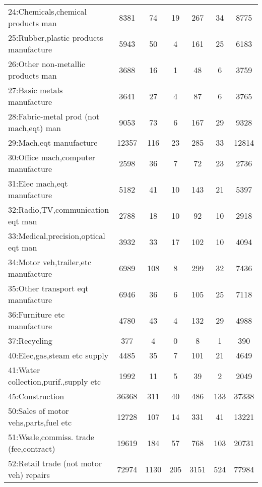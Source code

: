 {\begin{longtable}{l*{6}{c}}
24:Chemicals,chemical products man&     8381&       74&       19&      267&       34&     8775\\
25:Rubber,plastic products manufacture&     5943&       50&        4&      161&       25&     6183\\
26:Other non-metallic products man&     3688&       16&        1&       48&        6&     3759\\
27:Basic metals manufacture&     3641&       27&        4&       87&        6&     3765\\
28:Fabric-metal prod (not mach,eqt) man&     9053&       73&        6&      167&       29&     9328\\
29:Mach,eqt manufacture&    12357&      116&       23&      285&       33&    12814\\
30:Office mach,computer manufacture&     2598&       36&        7&       72&       23&     2736\\
31:Elec mach,eqt manufacture&     5182&       41&       10&      143&       21&     5397\\
32:Radio,TV,communication eqt man&     2788&       18&       10&       92&       10&     2918\\
33:Medical,precision,optical eqt man&     3932&       33&       17&      102&       10&     4094\\
34:Motor veh,trailer,etc manufacture&     6989&      108&        8&      299&       32&     7436\\
35:Other transport eqt manufacture&     6946&       36&        6&      105&       25&     7118\\
36:Furniture etc manufacture&     4780&       43&        4&      132&       29&     4988\\
37:Recycling&      377&        4&        0&        8&        1&      390\\
40:Elec,gas,steam etc supply&     4485&       35&        7&      101&       21&     4649\\
41:Water collection,purif.,supply etc&     1992&       11&        5&       39&        2&     2049\\
45:Construction&    36368&      311&       40&      486&      133&    37338\\
50:Sales of motor vehs,parts,fuel etc&    12728&      107&       14&      331&       41&    13221\\
51:Wsale,commiss. trade (fee,contract)&    19619&      184&       57&      768&      103&    20731\\
52:Retail trade (not motor veh) repairs&    72974&     1130&      205&     3151&      524&    77984\\

\end{longtable}}
